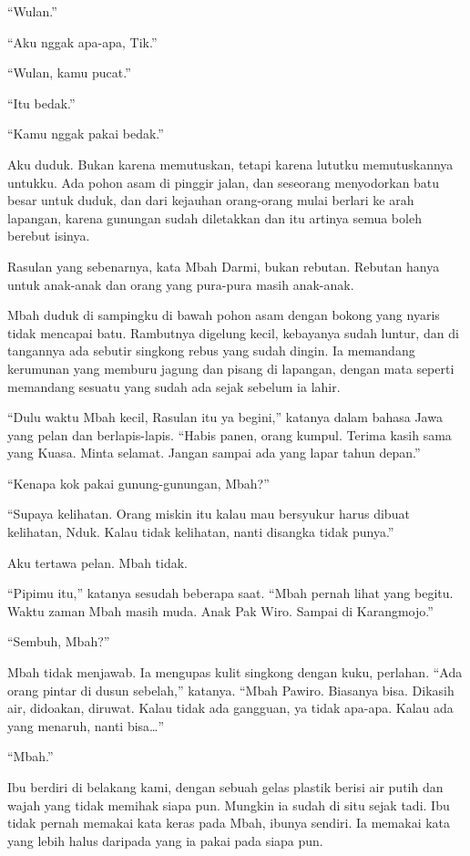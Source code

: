 \documentclass[11pt,twoside,openany]{book}
\makeatletter
\newcommand{\scenebreak}{\par\vspace{0.9em}{\centering\textsc{*\hspace{0.7em}*\hspace{0.7em}*}\par}\vspace{0.9em}\@afterindentfalse\@afterheading}
\makeatother
\begin{document}
``Wulan.''

``Aku nggak apa-apa, Tik.''

``Wulan, kamu pucat.''

``Itu bedak.''

``Kamu nggak pakai bedak.''

Aku duduk. Bukan karena memutuskan, tetapi karena lututku memutuskannya untukku. Ada pohon asam di pinggir jalan, dan seseorang menyodorkan batu besar untuk duduk, dan dari kejauhan orang-orang mulai berlari ke arah lapangan, karena gunungan sudah diletakkan dan itu artinya semua boleh berebut isinya.

\scenebreak
Rasulan yang sebenarnya, kata Mbah Darmi, bukan rebutan. Rebutan hanya untuk anak-anak dan orang yang pura-pura masih anak-anak.

Mbah duduk di sampingku di bawah pohon asam dengan bokong yang nyaris tidak mencapai batu. Rambutnya digelung kecil, kebayanya sudah luntur, dan di tangannya ada sebutir singkong rebus yang sudah dingin. Ia memandang kerumunan yang memburu jagung dan pisang di lapangan, dengan mata seperti memandang sesuatu yang sudah ada sejak sebelum ia lahir.

``Dulu waktu Mbah kecil, Rasulan itu ya begini,'' katanya dalam bahasa Jawa yang pelan dan berlapis-lapis. ``Habis panen, orang kumpul. Terima kasih sama yang Kuasa. Minta selamat. Jangan sampai ada yang lapar tahun depan.''

``Kenapa kok pakai gunung-gunungan, Mbah?''

``Supaya kelihatan. Orang miskin itu kalau mau bersyukur harus dibuat kelihatan, Nduk. Kalau tidak kelihatan, nanti disangka tidak punya.''

Aku tertawa pelan. Mbah tidak.

``Pipimu itu,'' katanya sesudah beberapa saat. ``Mbah pernah lihat yang begitu. Waktu zaman Mbah masih muda. Anak Pak Wiro. Sampai di Karangmojo.''

``Sembuh, Mbah?''

Mbah tidak menjawab. Ia mengupas kulit singkong dengan kuku, perlahan. ``Ada orang pintar di dusun sebelah,'' katanya. ``Mbah Pawiro. Biasanya bisa. Dikasih air, didoakan, diruwat. Kalau tidak ada gangguan, ya tidak apa-apa. Kalau ada yang menaruh, nanti bisa\ldots{}''

``Mbah.''

Ibu berdiri di belakang kami, dengan sebuah gelas plastik berisi air putih dan wajah yang tidak memihak siapa pun. Mungkin ia sudah di situ sejak tadi. Ibu tidak pernah memakai kata keras pada Mbah, ibunya sendiri. Ia memakai kata yang lebih halus daripada yang ia pakai pada siapa pun.
\end{document}
